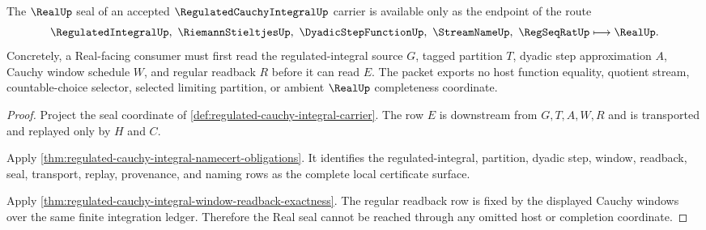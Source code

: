 \begin{theorem}
\label{thm:regulated-cauchy-integral-real-seal-nonescape}
The $\RealUp$ seal of an accepted $\RegulatedCauchyIntegralUp$ carrier is available only as the endpoint of the route
$$
\RegulatedIntegralUp,\ \RiemannStieltjesUp,\ \DyadicStepFunctionUp,\ \StreamNameUp,\ \RegSeqRatUp \longmapsto \RealUp .
$$
Concretely, a Real-facing consumer must first read the regulated-integral source $G$, tagged partition $T$, dyadic step approximation $A$, Cauchy window schedule $W$, and regular readback $R$ before it can read $E$. The packet exports no host function equality, quotient stream, countable-choice selector, selected limiting partition, or ambient $\RealUp$ completeness coordinate.
\end{theorem}
\begin{proof}
Project the seal coordinate of \autoref{def:regulated-cauchy-integral-carrier}. The row $E$ is downstream from $G,T,A,W,R$ and is transported and replayed only by $H$ and $C$.

Apply \autoref{thm:regulated-cauchy-integral-namecert-obligations}. It identifies the regulated-integral, partition, dyadic step, window, readback, seal, transport, replay, provenance, and naming rows as the complete local certificate surface.

Apply \autoref{thm:regulated-cauchy-integral-window-readback-exactness}. The regular readback row is fixed by the displayed Cauchy windows over the same finite integration ledger. Therefore the Real seal cannot be reached through any omitted host or completion coordinate.
\end{proof}



